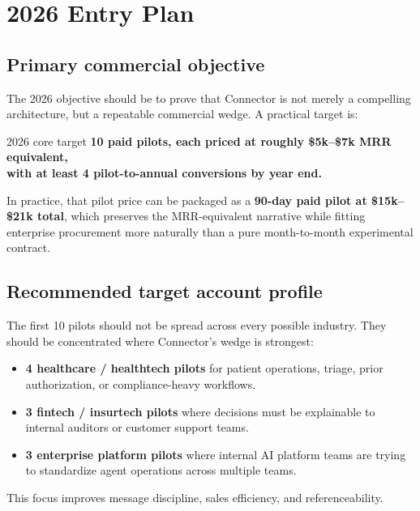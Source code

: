 \section{2026 Entry Plan}

\subsection{Primary commercial objective}

The 2026 objective should be to prove that Connector is not merely a compelling
architecture, but a repeatable commercial wedge. A practical target is:

\begin{conceptbox}{2026 core target}
\centering
\textbf{10 paid pilots, each priced at roughly \$5k--\$7k MRR equivalent,}\\[2pt]
\textbf{with at least 4 pilot-to-annual conversions by year end.}
\end{conceptbox}

In practice, that pilot price can be packaged as a \textbf{90-day paid pilot at
\$15k--\$21k total}, which preserves the MRR-equivalent narrative while fitting
enterprise procurement more naturally than a pure month-to-month experimental
contract.

\subsection{Recommended target account profile}

The first 10 pilots should not be spread across every possible industry. They
should be concentrated where Connector's wedge is strongest:

\begin{itemize}[leftmargin=1.5em,itemsep=2pt]
  \item \textbf{4 healthcare / healthtech pilots} for patient operations,
        triage, prior authorization, or compliance-heavy workflows.
  \item \textbf{3 fintech / insurtech pilots} where decisions must be explainable
        to internal auditors or customer support teams.
  \item \textbf{3 enterprise platform pilots} where internal AI platform teams are
        trying to standardize agent operations across multiple teams.
\end{itemize}

This focus improves message discipline, sales efficiency, and referenceability.


